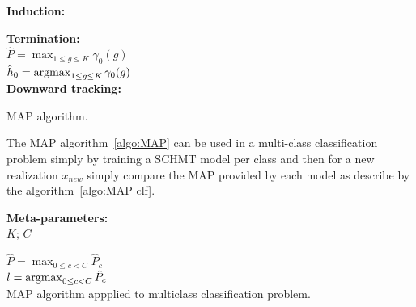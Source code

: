 \documentclass[a4paper,11pt]{report}
\begin{document}
{\begin{center}
\begin{algorithm}
				\textbf{Induction:}\\
				
				\textbf{Termination:}\\
					$\hat{P} = \max_{1\leq g \leq K} \gamma_{0}(g)$\\
					$\hat{h}_{0} = \mathop{\rm argmax}_{1\leq g \leq K} \gamma_{0}(g)$\\
				
				\textbf{Downward tracking:}\\
				
				\caption{MAP algorithm.}
				\label{algo:MAP}
			\end{algorithm}        
		\end{center}
		
		The MAP algorithm~\ref{algo:MAP} can be used in a multi-class classification problem simply by training a SCHMT model per class and then for a new realization $x_{new}$ simply compare the MAP provided by each model as describe by the algorithm~\ref{algo:MAP clf}.
		
		\begin{center}
			\begin{algorithm}
				\textbf{Meta-parameters:}\\
					$K$; $C$ 
					
				
				$\hat{P}= \max_{0\leq c < C} \hat{P}_{c}$\\
				$l= \mathop{\rm argmax}_{0\leq c < C} \hat{P}_{c}$\\
				
				\caption{MAP algorithm appplied to multiclass classification problem.}
				\label{algo:MAP clf}
			\end{algorithm}        
		\end{center}
    
}
\end{document}
